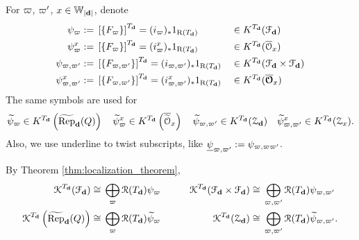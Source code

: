 \begin{defn}\label{def:localization_basis}
For $\varpi$, $\varpi'$, $x \in \mathbb{W}_{|\mathbf{d}|}$, denote
\begin{equation*}
\begin{aligned}
  \psi_{\varpi}:=\;& \left[\{F_{\varpi}\} \right]^{T_{\mathbf{d}}} = (i_{\varpi})_{*} 1_{\operatorname{\operatorname{R}}(T_{\mathbf{d}})} && \in K^{T_{\mathbf{d}}} (\mathcal{F}_{\mathbf{d}}) \\ 
  \psi_{\varpi}^{x}:=\;& \left[\{F_{\varpi}\} \right]^{T_{\mathbf{d}}} = (i_{\varpi}^x)_{*} 1_{\operatorname{\operatorname{R}}(T_{\mathbf{d}})} && \in K^{T_{\mathbf{d}}} (\overline{\mathcal{O}}_x) \\ 
  \psi_{\varpi,\varpi'}:=\;& \left[\{F_{\varpi,\varpi'}\} \right]^{T_{\mathbf{d}}} = (i_{\varpi,\varpi'})_{*} 1_{\operatorname{\operatorname{R}}(T_{\mathbf{d}})} && \in K^{T_{\mathbf{d}}} (\mathcal{F}_{\mathbf{d}} \times \mathcal{F}_{\mathbf{d}} ) \\ 
  \psi_{\varpi,\varpi'}^{x}:=\;& \left[\{F_{\varpi,\varpi'}\} \right]^{T_{\mathbf{d}}} = (i_{\varpi,\varpi'}^{x})_{*} 1_{\operatorname{\operatorname{R}}(T_{\mathbf{d}})} && \in K^{T_{\mathbf{d}}} (\overline{\boldsymbol{\mathcal{O}}}_x) \\ 
\end{aligned}
\end{equation*}
The same symbols are used for 
$$\widetilde{\psi}_{\varpi} \in K^{T_{\mathbf{d}}} \left( \operatorname{\widetilde{\operatorname{Rep}}}_{\mathbf{d}}(Q) \right)  \quad  \widetilde{\psi}_{\varpi}^{x} \in K^{T_{\mathbf{d}}} \left( \overline{\widetilde{\mathcal{O}}}_x \right)  \quad  \widetilde{\psi}_{\varpi,\varpi'} \in K^{T_{\mathbf{d}}} (\operatorname{\mathcal{Z}}_{\mathbf{d}})  \quad  \widetilde{\psi}_{\varpi,\varpi'}^{x} \in K^{T_{\mathbf{d}}} (\operatorname{\mathcal{Z}}_x).$$
Also, we use underline to twist subscripts, like $\underline{\psi}_{\varpi,\varpi'}:=\psi_{\varpi,\varpi\varpi'}$.
\end{defn}

By Theorem \ref{thm:localization_theorem},
\begin{equation*}
\begin{aligned}
   \operatorname{\operatorname{\mathcal{K}}}^{T_{\mathbf{d}}} (\mathcal{F}_{\mathbf{d}}) \cong\;& \bigoplus_{\varpi} \operatorname{\operatorname{\mathcal{R}}}(T_{\mathbf{d}}) \psi_{\varpi}\qquad & \operatorname{\operatorname{\mathcal{K}}}^{T_{\mathbf{d}}} (\mathcal{F}_{\mathbf{d}} \times \mathcal{F}_{\mathbf{d}} ) \cong\;& \bigoplus_{\varpi,\varpi'} \operatorname{\operatorname{\mathcal{R}}}(T_{\mathbf{d}}) \psi_{\varpi,\varpi'} \\ 
   \operatorname{\operatorname{\mathcal{K}}}^{T_{\mathbf{d}}} \left(\operatorname{\widetilde{\operatorname{Rep}}}_{\mathbf{d}}(Q)\right) \cong\;& \bigoplus_{\varpi} \operatorname{\operatorname{\mathcal{R}}}(T_{\mathbf{d}}) \widetilde{\psi}_{\varpi} & \operatorname{\operatorname{\mathcal{K}}}^{T_{\mathbf{d}}} (\operatorname{\mathcal{Z}}_{\mathbf{d}} ) \cong\;& \bigoplus_{\varpi,\varpi'} \operatorname{\operatorname{\mathcal{R}}}(T_{\mathbf{d}}) \widetilde{\psi}_{\varpi,\varpi'}. \\ 
\end{aligned}
\end{equation*}

